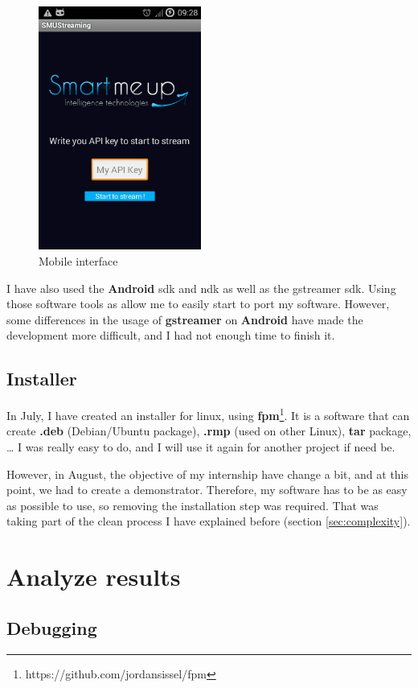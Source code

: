 \documentclass[a4paper,11pt]{custom}
\newcommand{\gstreamer}{\textbf{gstreamer}\xspace}
\newcommand{\fpm}{\textbf{fpm}\xspace}
\newcommand{\android}{\textbf{Android}\xspace}
\begin{document}
\begin{figure}
\centering
\includegraphics[height=8cm]{smu_mobile.jpg}
\caption{Mobile interface}
\label{fig:smumobile}
\end{figure}

I have also used the \android{} sdk and ndk as well as the gstreamer sdk. Using
those software tools as allow me to easily start to port my software. However,
some differences in the usage of \gstreamer{} on \android{} have made the
development more difficult, and I had not enough time to finish it.

\subsection{Installer}

In July, I have created an installer for linux, using
\fpm{}\footnote{https://github.com/jordansissel/fpm}. It is a software that can
create \textbf{.deb} (Debian/Ubuntu package), \textbf{.rmp} (used on other
Linux), \textbf{tar} package, … I was really easy to do, and I will use it again
for another project if need be.

However, in August, the objective of my internship have change a bit, and at this
point, we had to create a demonstrator. Therefore, my software has to be as easy
as possible to use, so removing the installation step was required. That was
taking part of the clean process I have explained before (section
\ref{sec:complexity}).

\section{Analyze results}

\subsection{Debugging}
\end{document}
